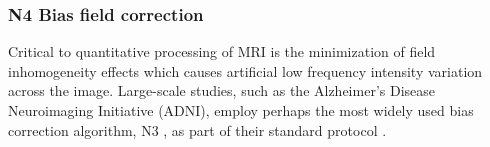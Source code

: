 %


\subsubsection{N4 Bias field correction}

Critical to quantitative processing of MRI is the minimization of
field inhomogeneity effects which causes artificial low frequency 
intensity variation across the image.  Large-scale studies, such
as the Alzheimer's Disease Neuroimaging Initiative (ADNI), employ
perhaps the most widely used bias correction algorithm, N3 \cite{sled1998}, 
as part of their standard protocol \citep{boyes2008}.


